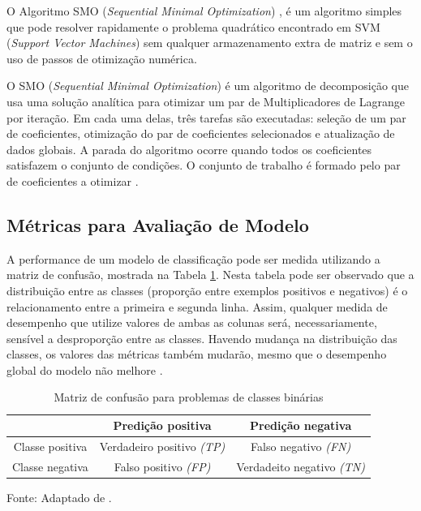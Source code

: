 \documentclass[
	12pt,				%
	openright,			%
	oneside,	
	a4paper,				%
	english,				%
	brazil				%
]{abntex2/abntex2} %
\begin{document}
	O Algoritmo SMO (\textit{Sequential Minimal Optimization}) \cite{platt:1998}, é um algoritmo simples que pode resolver rapidamente o problema quadrático encontrado em SVM (\textit{Support Vector Machines}) sem qualquer armazenamento extra de matriz e sem o uso de passos de otimização numérica.
	
	O SMO (\textit{Sequential Minimal Optimization}) é um algoritmo de decomposição  que usa uma solução analítica para otimizar um par de Multiplicadores de Lagrange por iteração. Em cada uma delas, três tarefas são executadas: seleção de um par de coeficientes, otimização do par de coeficientes selecionados e atualização de dados globais. A parada do algoritmo ocorre quando todos os coeficientes satisfazem o conjunto de condições. O conjunto de trabalho é formado pelo par de coeficientes a otimizar \cite{hernandez:2009}. 

	\subsection{Métricas para Avaliação de Modelo}
	
	A performance de um modelo de classificação pode ser medida utilizando a matriz de confusão, mostrada na Tabela \ref{tabMatrizConfusao}. Nesta tabela pode ser observado que a distribuição entre as classes (proporção entre exemplos positivos e negativos) é o relacionamento entre a primeira e segunda linha. Assim, qualquer medida de desempenho que utilize valores de ambas as colunas será, necessariamente, sensível a desproporção entre as classes. Havendo mudança na distribuição das classes, os valores das métricas também mudarão, mesmo que o desempenho global do modelo não melhore \cite{prati:2008}.
	\\
	
		\begin{table}[htbp]
			\centering
			\caption{Matriz de confusão para problemas de classes binárias}
			\label{tabMatrizConfusao}
			\begin{center}
				\renewcommand{\arraystretch}{2}
				\begin{tabular}{ccc}
					\hline
					               & \textbf{Predição positiva}               & \textbf{Predição negativa}         \\ \hline
					\multicolumn{1}{c|}{Classe positiva}                                      & Verdadeiro positivo \textit{(TP)}                                                                                 & Falso negativo \textit{(FN)} 							                                                                                    
					\\
					\multicolumn{1}{c|}{Classe negativa}                                      & Falso positivo \textit{(FP)}                                                                                  &Verdadeito negativo \textit{(TN)} 							                                                                                   							            
					\\ 
					\hline
				\end{tabular}
			\end{center}
			Fonte: Adaptado de \cite{prati:2008}.
		\end{table}
		
\end{document}
